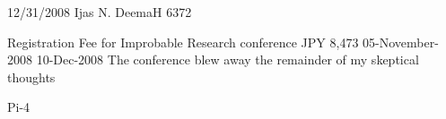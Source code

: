 \documentclass[a4,14pt]{form3}
\begin{document}
\sealbox %

  \appdetails
  { 12/31/2008}   %
  {Ijas N. DeemaH} %
  {6372} %

\begin{report}
  \details
      {Registration Fee for Improbable Research conference}
      {JPY 8,473}         %
      {05-November-2008}  %
      {10-Dec-2008}        %
      {The conference blew away the remainder of my skeptical thoughts}   %
\end{report}

\begin{misc}
  \miscbudget
      {Pi-4}  %
\end{misc}
\end{document}
